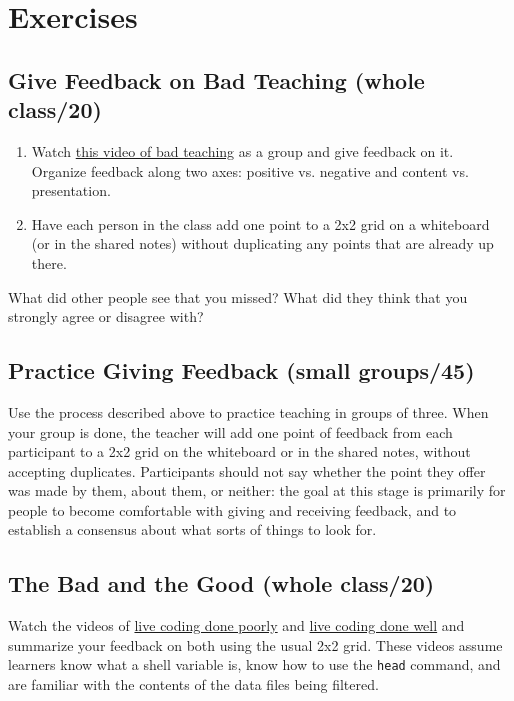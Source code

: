 \section{Exercises}\label{s:performance-exercises}

\subsection{Give Feedback on Bad Teaching (whole class/20)}\label{give-feedback-on-bad-teaching-whole-class20}

\begin{enumerate}
\item
  Watch \href{https://www.youtube.com/watch?v=-ApVt04rB4U}{this video of bad teaching} as a group
  and give feedback on it. Organize feedback along two axes: positive
  vs. negative and content vs. presentation.
\item
  Have each person in the class add one point to a 2x2 grid on a
  whiteboard (or in the shared notes) without duplicating any points
  that are already up there.
\end{enumerate}

What did other people see that you missed? What did they think that you
strongly agree or disagree with?

\subsection{Practice Giving Feedback (small groups/45)}\label{practice-giving-feedback-small-groups45}

Use the process described above to practice teaching in groups of
three. When your group is done, the teacher will add one point of
feedback from each participant to a 2x2 grid on the whiteboard or in
the shared notes, without accepting duplicates. Participants should
not say whether the point they offer was made by them, about them, or
neither: the goal at this stage is primarily for people to become
comfortable with giving and receiving feedback, and to establish a
consensus about what sorts of things to look for.

\subsection{The Bad and the Good (whole class/20)}\label{the-bad-and-the-good-whole-class20}

Watch the videos of \href{https://youtu.be/bXxBeNkKmJE}{live coding done poorly}
and \href{https://youtu.be/SkPmwe_WjeY}{live coding done well} and summarize your
feedback on both using the usual 2x2 grid. These videos assume
learners know what a shell variable is, know how to use the \texttt{head}
command, and are familiar with the contents of the data files being
filtered.

